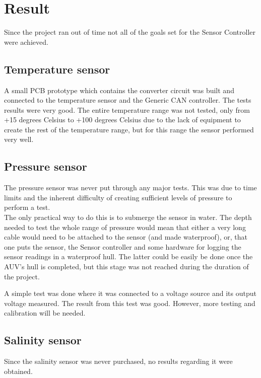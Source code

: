 
\section{Result}\label{sec:result}
Since the project ran out of time not all of the goals set for the Sensor Controller were achieved. 

\subsection{Temperature sensor}
A small PCB prototype which contains the converter circuit was built and connected to the temperature sensor and the Generic CAN controller. The tests results were very good. The entire temperature range was not tested, only from +15 degrees Celsius to +100 degrees Celsius due to the lack of equipment to create the rest of the temperature range, but for this range the sensor performed very well. 

\subsection{Pressure sensor}
The pressure sensor was never put through any major tests. This was due to time limits and the inherent difficulty of creating sufficient levels of pressure to perform a test. \\
The only practical way to do this is to submerge the sensor in water. The depth needed to test the whole range of pressure would mean that either a very long cable would need to be attached to the sensor (and made waterproof), or, that one puts the sensor, the Sensor controller and some hardware for  logging the sensor readings in a waterproof hull. The latter could be easily be done once the AUV's hull is completed, but this stage was not reached during the duration of the project.

A simple test was done where it was connected to a voltage source and its output voltage measured. The result from this test was good. However, more testing and calibration will be needed.

\subsection{Salinity sensor}
Since the salinity sensor was never purchased, no results regarding it were obtained.

